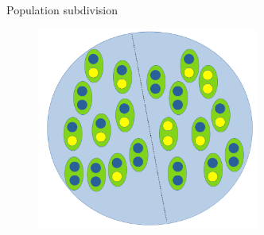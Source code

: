 \begin{frame}{Population subdivision}

	\begin{figure}
                \includegraphics[width=0.65\textwidth]{Pics/division}
        \end{figure}

\end{frame}



